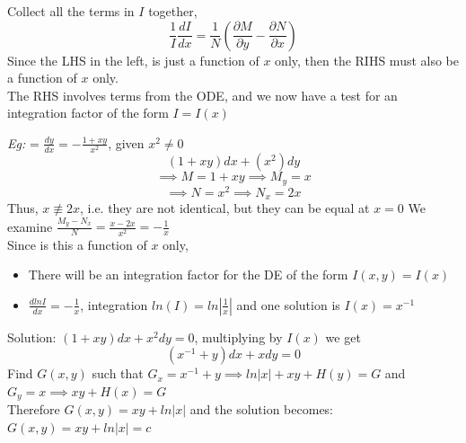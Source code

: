 \documentclass[11pt]{article}
\theoremstyle{definition}
\begin{document}
Collect all the terms in $I$ together,
$$\frac{1}{I}\frac{dI}{dx} = \frac{1}{N}(\frac{\partial M}{\partial y} - \frac{\partial N}{\partial x})$$
Since the LHS in the left, is just a function of $x$ only, then the RIHS must also be a function of $x$ only.\\
The RHS involves terms from the ODE, and we now have a test for an integration factor of the form $I = I(x)$

\textit{Eg:} = $\frac{dy}{dx} = -\frac{1+xy}{x^2}$, given $x^2 \neq 0$
$$(1+xy)dx + (x^2)dy$$
$$\implies M = 1+xy \implies M_y = x$$
$$\implies N = x^2 \implies N_x = 2x$$
Thus, $x \not\equiv 2x$, i.e. they are not identical, but they can be equal at $x = 0$
We examine $\frac{M_y - N_x}{N} = \frac{x-2x}{x^2} = -\frac{1}{x}$\\
Since is this a function of $x$ only,
\begin{itemize}
    \item There will be an integration factor for the DE of the form $I(x,y) = I(x)$
    \item $\frac{dlnI}{dx} = -\frac{1}{x}$, integration $ln(I) = ln|\frac{1}{x}|$ and one solution is $I(x) = x^{-1}$
\end{itemize}
Solution: $(1+xy)dx + x^2dy = 0$, multiplying by $I(x)$ we get $$(x^{-1} +y)dx + xdy = 0$$
Find $G(x,y)$ such that $G_x = x^{-1} + y \implies ln|x| + xy + H(y) = G$
and $G_y = x \implies xy + H(x) = G$\\
Therefore $G(x,y) = xy + ln|x|$ and the solution becomes: $G(x,y) = xy + ln|x| = c$\\
\end{document}
